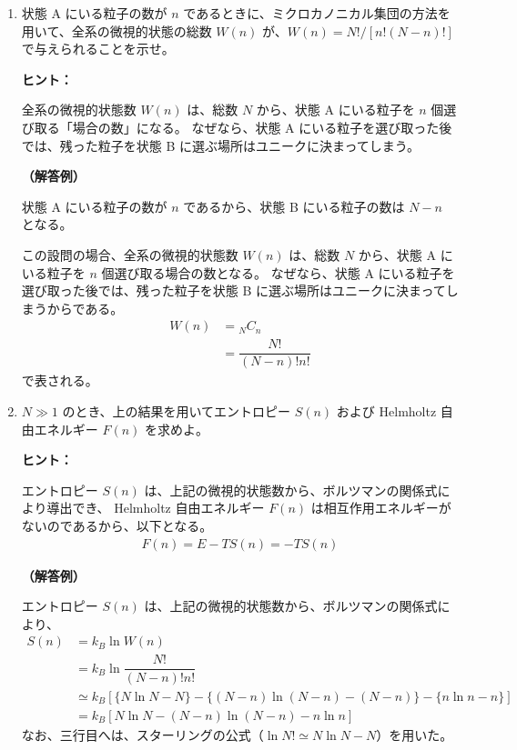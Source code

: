 \documentclass[uplatex,dvipdfmx,a4paper,11pt]{jsarticle}
\begin{document}
\begin{enumerate}
\setlength{\parskip}{0cm} %
\setlength{\itemsep}{0.3cm} %

\item
状態 A にいる粒子の数が $n$ であるときに、ミクロカノニカル集団の方法を用いて、全系の微視的状態の総数 $W(n)$ が、$W(n) = N!/[ n! (N-n)!]$ で与えられることを示せ。
\vspace{8pt}

\begin{itembox}[l]{{\bf ヒント：}}

全系の微視的状態数 $W(n)$ は、総数 $N$ から、状態 A にいる粒子を $n$ 個選び取る「場合の数」になる。
なぜなら、状態 A にいる粒子を選び取った後では、残った粒子を状態 B に選ぶ場所はユニークに決まってしまう。

\end{itembox}

{\bf （解答例）}

状態 A にいる粒子の数が $n$ であるから、状態 B にいる粒子の数は $N-n$ となる。

この設問の場合、全系の微視的状態数 $W(n)$ は、総数 $N$ から、状態 A にいる粒子を $n$ 個選び取る場合の数となる。
なぜなら、状態 A にいる粒子を選び取った後では、残った粒子を状態 B に選ぶ場所はユニークに決まってしまうからである。
\begin{align*}
W(n) 
	&= {}_N C_{n} \\
	&= \dfrac{N!}{(N-n)! n!}
\end{align*}
で表される。

\newpage

\item
$N \gg 1$ のとき、上の結果を用いてエントロピー $S(n)$ および Helmholtz 自由エネルギー $F(n)$ を求めよ。
\vspace{8pt}

\begin{itembox}[l]{{\bf ヒント：}}

エントロピー $S(n)$ は、上記の微視的状態数から、ボルツマンの関係式により導出でき、 Helmholtz 自由エネルギー $F(n)$ は相互作用エネルギーがないのであるから、以下となる。
\begin{align*}
F(n) = E - TS(n) = -TS(n)
\end{align*}

\end{itembox}

{\bf （解答例）}

エントロピー $S(n)$ は、上記の微視的状態数から、ボルツマンの関係式により、
\begin{align*}
S(n) 
	&= k_B \ln W(n) \\
	&= k_B \ln \dfrac{N!}{(N-n)! n!} \\
	&\simeq k_B [ \{N\ln N - N \} - \{(N-n) \ln (N-n) - (N-n) \} - \{n\ln n -n\} ] \\
	&= k_B [ N\ln N  - (N-n) \ln (N-n)  - n\ln n ]
\end{align*}
なお、三行目へは、スターリングの公式（$\ln N! \simeq N \ln N - N$）を用いた。


\end{enumerate}
\end{document}
